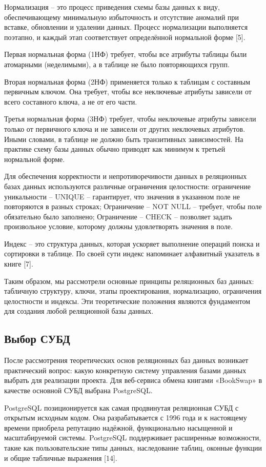 \documentclass[14pt,a4paper]{extarticle}
\begin{document}
Нормализация -- это процесс приведения схемы базы данных к виду,
обеспечивающему минимальную избыточность и отсутствие аномалий при
вставке, обновлении и удалении данных. Процесс нормализации выполняется
поэтапно, и каждый этап соответствует определённой нормальной форме
[5].

Первая нормальная форма (1НФ) требует, чтобы все атрибуты таблицы были
атомарными (неделимыми), а в таблице не было повторяющихся групп.

Вторая нормальная форма (2НФ) применяется только к таблицам с составным
первичным ключом. Она требует, чтобы все неключевые атрибуты зависели от
всего составного ключа, а не от его части.

Третья нормальная форма (3НФ) требует, чтобы неключевые атрибуты
зависели только от первичного ключа и не зависели от других неключевых
атрибутов. Иными словами, в таблице не должно быть транзитивных
зависимостей. На практике схему базы данных обычно приводят как минимум
к третьей нормальной форме.

Для обеспечения корректности и непротиворечивости данных в реляционных
базах данных используются различные ограничения целостности: ограничение
уникальности -- UNIQUE -- гарантирует, что значения в указанном поле не
повторяются в разных строках; Ограничение -- NOT NULL -- требует, чтобы
поле обязательно было заполнено; Ограничение -- CHECK -- позволяет
задать произвольное условие, которому должны удовлетворять значения в
поле.

Индекс -- это структура данных, которая ускоряет выполнение операций
поиска и сортировки в таблице. По своей сути индекс напоминает
алфавитный указатель в книге [7].

Таким образом, мы рассмотрели основные принципы реляционных баз данных:
табличную структуру, ключи, этапы проектирования, нормализацию,
ограничения целостности и индексы. Эти теоретические положения являются
фундаментом для создания любой реляционной базы данных.

\subsection{Выбор СУБД}

После рассмотрения теоретических основ реляционных баз данных возникает
практический вопрос: какую конкретную систему управления базами данных
выбрать для реализации проекта. Для веб-сервиса обмена книгами
«BookSwap» в качестве основной СУБД выбрана PostgreSQL.

PostgreSQL позиционируется как самая продвинутая реляционная СУБД с
открытым исходным кодом. Она разрабатывается с 1996 года и к настоящему
времени приобрела репутацию надёжной, функционально насыщенной и
масштабируемой системы. PostgreSQL поддерживает расширенные возможности,
такие как пользовательские типы данных, наследование таблиц, оконные
функции и общие табличные выражения [14].
\end{document}
